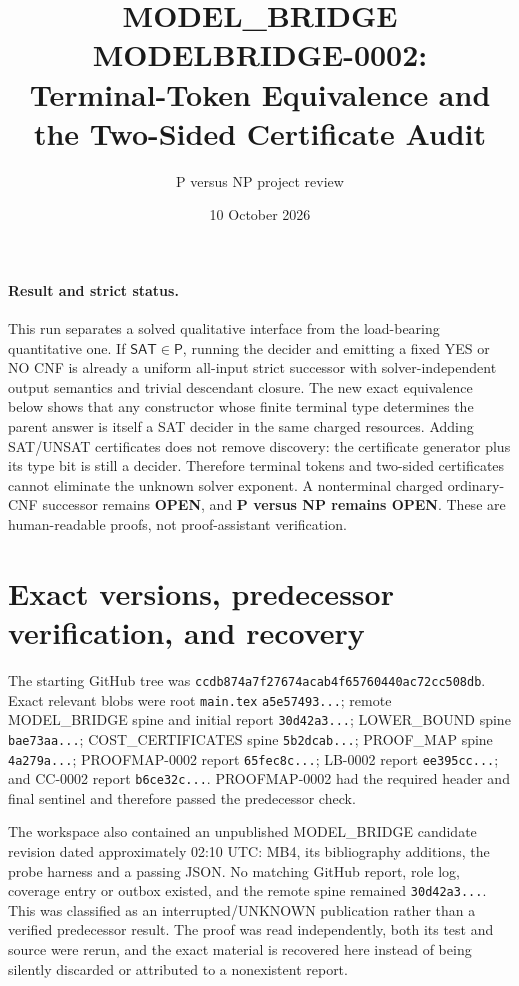 \documentclass[11pt]{article}
\title{MODEL\_BRIDGE MODELBRIDGE-0002:\\
Terminal-Token Equivalence and the Two-Sided Certificate Audit}
\author{P versus NP project review}
\date{10 October 2026}
\newcommand{\SAT}{\mathsf{SAT}}
\begin{document}
\maketitle

\paragraph{Result and strict status.}
This run separates a solved qualitative interface from the load-bearing
quantitative one.  If $\SAT\in\mathsf P$, running the decider and emitting a
fixed YES or NO CNF is already a uniform all-input strict successor with
solver-independent output semantics and trivial descendant closure.  The
new exact equivalence below shows that any constructor whose finite terminal
type determines the parent answer is itself a SAT decider in the same
charged resources.  Adding SAT/UNSAT certificates does not remove discovery:
the certificate generator plus its type bit is still a decider.  Therefore
terminal tokens and two-sided certificates cannot eliminate the unknown
solver exponent.  A nonterminal charged ordinary-CNF successor remains
\textbf{OPEN}, and \textbf{P versus NP remains OPEN}.  These are
human-readable proofs, not proof-assistant verification.

\section{Exact versions, predecessor verification, and recovery}
The starting GitHub tree was
\texttt{ccdb874a7f27674acab4f65760440ac72cc508db}.  Exact relevant blobs were
root \texttt{main.tex} \texttt{a5e57493...}; remote MODEL\_BRIDGE spine and
initial report \texttt{30d42a3...}; LOWER\_BOUND spine
\texttt{bae73aa...}; COST\_CERTIFICATES spine \texttt{5b2dcab...};
PROOF\_MAP spine \texttt{4a279a...}; PROOFMAP-0002 report
\texttt{65fec8c...}; LB-0002 report \texttt{ee395cc...}; and CC-0002
report \texttt{b6ce32c...}.  PROOFMAP-0002 had the required header and final
sentinel and therefore passed the predecessor check.

The workspace also contained an unpublished MODEL\_BRIDGE candidate revision
dated approximately 02:10 UTC: MB4, its bibliography additions, the probe
harness and a passing JSON.  No matching GitHub report, role log, coverage
entry or outbox existed, and the remote spine remained \texttt{30d42a3...}.
This was classified as an interrupted/UNKNOWN publication rather than a
verified predecessor result.  The proof was read independently, both its
test and source were rerun, and the exact material is recovered here instead
of being silently discarded or attributed to a nonexistent report.
\end{document}

